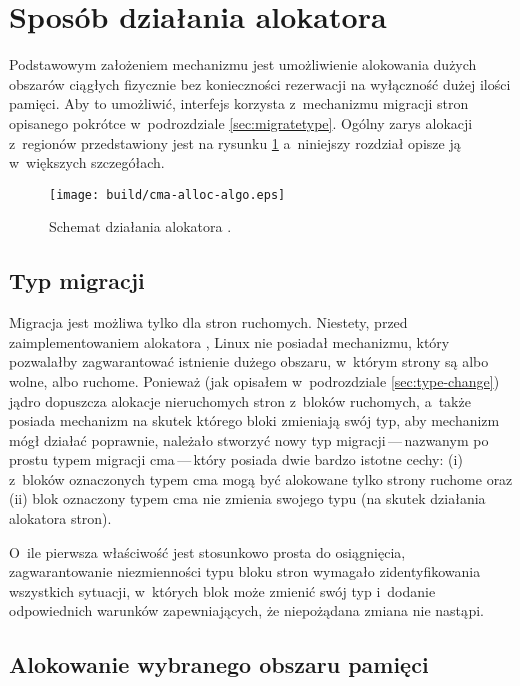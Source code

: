 \section{Sposób działania alokatora }

Podstawowym założeniem mechanizmu  jest umożliwienie
alokowania dużych obszarów ciągłych fizycznie bez konieczności
rezerwacji na wyłączność dużej ilości pamięci.  Aby to umożliwić,
interfejs  korzysta z~mechanizmu migracji stron opisanego
pokrótce w~podrozdziale \ref{sec:migratetype}.  Ogólny zarys alokacji
z~regionów  przedstawiony jest na rysunku
\ref{fig:cma-alloc-algo} a~niniejszy rozdział opisze ją w~większych
szczegółach.

\begin{figure}[tbp]
  \texttt{[image: build/cma-alloc-algo.eps]}
  \caption{Schemat działania alokatora .}
  \label{fig:cma-alloc-algo}
\end{figure}


\subsection{Typ migracji }\label{sec:migrate-cma}

Migracja jest możliwa tylko dla stron ruchomych.  Niestety, przed
zaimplementowaniem alokatora , Linux nie posiadał mechanizmu,
który pozwalałby zagwarantować istnienie dużego obszaru, w~którym
strony są albo wolne, albo ruchome.  Ponieważ (jak opisałem
w~podrozdziale \ref{sec:type-change}) jądro dopuszcza alokacje
nieruchomych stron z~bloków ruchomych, a~także posiada mechanizm na
skutek którego bloki zmieniają swój typ, aby mechanizm  mógł
działać poprawnie, należało stworzyć nowy typ migracji\,---\,nazwanym
po prostu typem migracji cma\,---\,który posiada dwie bardzo istotne
cechy: (i) z~bloków oznaczonych typem cma mogą być alokowane tylko
strony ruchome oraz (ii) blok oznaczony typem cma nie zmienia swojego
typu (na skutek działania alokatora stron).

O~ile pierwsza właściwość jest stosunkowo prosta do osiągnięcia,
zagwarantowanie niezmienności typu bloku stron wymagało
zidentyfikowania wszystkich sytuacji, w~których blok może zmienić swój
typ i~dodanie odpowiednich warunków zapewniających, że niepożądana
zmiana nie nastąpi.

\subsection{Alokowanie wybranego obszaru pamięci}\label{sec:alloc-contig-range}

